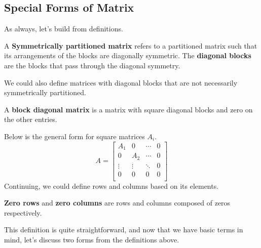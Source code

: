 \documentclass[../main.tex]{subfiles}
\begin{document}
\subsection{Special Forms of Matrix}

As always, let's build from definitions.

\begin{definition}
A \textbf{Symmetrically partitioned matrix} refers to a partitioned
matrix such that its arrangements of the blocks are diagonally
symmetric. The \textbf{diagonal blocks} are the blocks that pass
through the diagonal symmetry.
\end{definition}

We could also define matrices with diagonal blocks that are not
necessarily symmetrically partitioned.

\begin{definition}
A \textbf{block diagonal matrix} is a matrix with square diagonal
blocks and zero on the other entries.
\end{definition}

Below is the general form for square matrices $A_i$.
\[
A =
\begin{bmatrix}
    A_1    & 0      & \cdots & 0 \\
    0      & A_2    & \cdots & 0 \\
    \vdots & \vdots & \ddots & 0 \\
    0      & 0      & 0      & 0 \\
\end{bmatrix}
\]
Continuing, we could define rows and columns based on its elements.

\begin{definition}
\textbf{Zero rows} and \textbf{zero columns} are rows and columns
composed of zeros respectively.
\end{definition}

This definition is quite straightforward, and now that we have
basic terms in mind, let's discuss two forms from the definitions
above.
\end{document}

